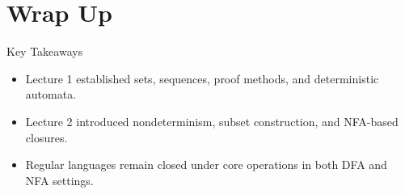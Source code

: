 \documentclass[aspectratio=169]{beamer}
\begin{document}
\section{Wrap Up}

\begin{frame}{Key Takeaways}
  \begin{itemize}
    \item Lecture 1 established sets, sequences, proof methods, and deterministic automata.
    \item Lecture 2 introduced nondeterminism, subset construction, and NFA-based closures.
    \item Regular languages remain closed under core operations in both DFA and NFA settings.
  \end{itemize}
\end{frame}
\end{document}
